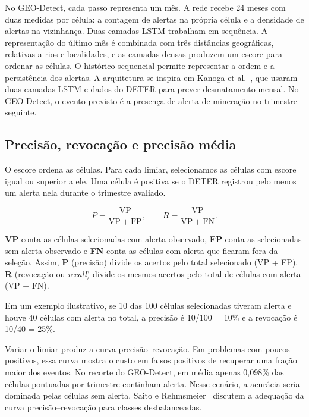 \documentclass[a4paper,conference]{IEEEtran}
\begin{document}
No GEO-Detect, cada passo representa um mês. A rede recebe 24 meses com duas medidas por célula: a contagem de alertas na própria célula e a densidade de alertas na vizinhança. Duas camadas LSTM trabalham em sequência. A representação do último mês é combinada com três distâncias geográficas, relativas a rios e localidades, e as camadas densas produzem um escore para ordenar as células. O histórico sequencial permite representar a ordem e a persistência dos alertas. A arquitetura se inspira em Kanoga et al.~\cite{kanoga2024}, que usaram duas camadas LSTM e dados do DETER para prever desmatamento mensal. No GEO-Detect, o evento previsto é a presença de alerta de mineração no trimestre seguinte.

\subsection{Precisão, revocação e precisão média}

O escore ordena as células. Para cada limiar, selecionamos as células com escore igual ou superior a ele. Uma célula é positiva se o DETER registrou pelo menos um alerta nela durante o trimestre avaliado.

\begin{equation}
P = \frac{\mathrm{VP}}{\mathrm{VP}+\mathrm{FP}}, \qquad R = \frac{\mathrm{VP}}{\mathrm{VP}+\mathrm{FN}}.
\end{equation}

\textbf{VP} conta as células selecionadas com alerta observado, \textbf{FP} conta as selecionadas sem alerta observado e \textbf{FN} conta as células com alerta que ficaram fora da seleção. Assim, \textbf{P} (precisão) divide os acertos pelo total selecionado (VP + FP). \textbf{R} (revocação ou \emph{recall}) divide os mesmos acertos pelo total de células com alerta (VP + FN).

Em um exemplo ilustrativo, se 10 das 100 células selecionadas tiveram alerta e houve 40 células com alerta no total, a precisão é 10/100 = 10\% e a revocação é 10/40 = 25\%.

Variar o limiar produz a curva precisão--revocação. Em problemas com poucos positivos, essa curva mostra o custo em falsos positivos de recuperar uma fração maior dos eventos. No recorte do GEO-Detect, em média apenas 0,098\% das células pontuadas por trimestre continham alerta. Nesse cenário, a acurácia seria dominada pelas células sem alerta. Saito e Rehmsmeier~\cite{saito2015} discutem a adequação da curva precisão--revocação para classes desbalanceadas.
\end{document}
